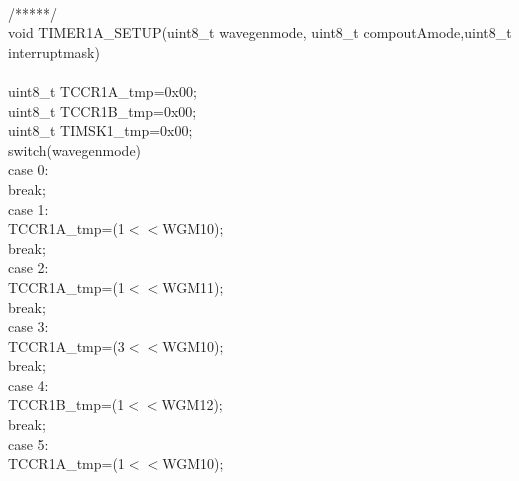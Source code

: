 \documentclass[titlepage, a4paper, 10pt, reqno, openany]{report}
\begin{document}
\begin{minipage}[t]{.35\linewidth}
	\textbraceright \\
	/*****/ \\
	void TIMER1A\_SETUP(uint8\_t wavegenmode, uint8\_t compoutAmode,uint8\_t interruptmask) \\
	\textbraceleft \\
	\hspace*{.5cm}	uint8\_t TCCR1A\_tmp=0x00; \\
	\hspace*{.5cm}	uint8\_t TCCR1B\_tmp=0x00; \\
	\hspace*{.5cm}	uint8\_t TIMSK1\_tmp=0x00; \\
	\hspace*{.5cm}	switch(wavegenmode)\textbraceleft \\
	\hspace*{1cm}		case 0: \\
	\hspace*{1.5cm}			break; \\
	\hspace*{1cm}		case 1: \\
	\hspace*{1.5cm}			TCCR1A\_tmp=(1$<<$WGM10); \\
	\hspace*{1.5cm}			break; \\
	\hspace*{1cm}		case 2: \\
	\hspace*{1.5cm}			TCCR1A\_tmp=(1$<<$WGM11); \\
	\hspace*{1.5cm}			break; \\
	\hspace*{1cm}		case 3: \\
	\hspace*{1.5cm}			TCCR1A\_tmp=(3$<<$WGM10); \\
	\hspace*{1.5cm}			break; \\
	\hspace*{1cm}		case 4: \\
	\hspace*{1.5cm}			TCCR1B\_tmp=(1$<<$WGM12); \\
	\hspace*{1.5cm}			break; \\
	\hspace*{1cm}		case 5: \\
	\hspace*{1.5cm}			TCCR1A\_tmp=(1$<<$WGM10); \\

\end{minipage}
\end{document}
